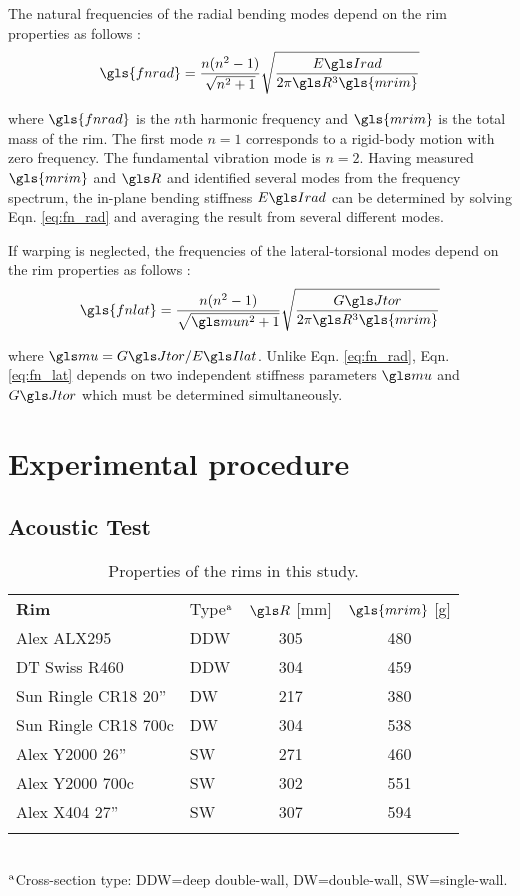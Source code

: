 \documentclass[../thesis.tex]{subfiles}
\begin{document}
The natural frequencies of the radial bending modes depend on the rim properties as follows \cite{Timoshenko1955}:
\begin{equation}\label{eq:fn_rad}
\gls{fnrad} = \frac{n(n^2-1)}{\sqrt{n^2+1}} \sqrt{\frac{\EIr}{2\pi \R^3 \gls{mrim}}}
\end{equation}

where $\gls{fnrad}$ is the $n$th harmonic frequency and $\gls{mrim}$ is the total mass of the rim. The first mode $n=1$ corresponds to a rigid-body motion with zero frequency. The fundamental vibration mode is $n=2$. Having measured $\gls{mrim}$ and $\R$ and identified several modes from the frequency spectrum, the in-plane bending stiffness $\EIr$ can be determined by solving Eqn. \eqref{eq:fn_rad} and averaging the result from several different modes.

If warping is neglected, the frequencies of the lateral-torsional modes depend on the rim properties as follows \cite{Timoshenko1955}:
\begin{equation}\label{eq:fn_lat}
\gls{fnlat} = \frac{n(n^2-1)}{\sqrt{\m n^2+1}} \sqrt{\frac{\GJ}{2\pi \R^3 \gls{mrim}}}
\end{equation}

where $\m=\GJ/\EIl$. Unlike Eqn. \eqref{eq:fn_rad}, Eqn. \eqref{eq:fn_lat} depends on two independent stiffness parameters $\m$ and $\GJ$ which must be determined simultaneously.


\section{Experimental procedure}

\subsection{Acoustic Test}

\begin{table}
  \caption{Properties of the rims in this study.\label{tb:rims}}
  \begin{tabular}{@{}llcc}
  \hline\noalign{\smallskip}
  \bf{Rim} & Type$^{\rm a}$ & $\R$ [mm] & $\gls{mrim}$ [g]\\
  \noalign{\smallskip}\hline\noalign{\smallskip}
  Alex ALX295          & DDW & 305 & 480\\
  DT Swiss R460        & DDW & 304 & 459\\
  Sun Ringle CR18 20'' & DW  & 217 & 380\\
  Sun Ringle CR18 700c & DW  & 304 & 538\\
  Alex Y2000 26''      & SW  & 271 & 460\\
  Alex Y2000 700c      & SW  & 302 & 551\\
  Alex X404 27''       & SW  & 307 & 594\\
  \noalign{\smallskip}\hline
  \end{tabular}\\
  $^{\rm a}$Cross-section type: DDW=deep double-wall, DW=double-wall, SW=single-wall.
\end{table}
\end{document}
